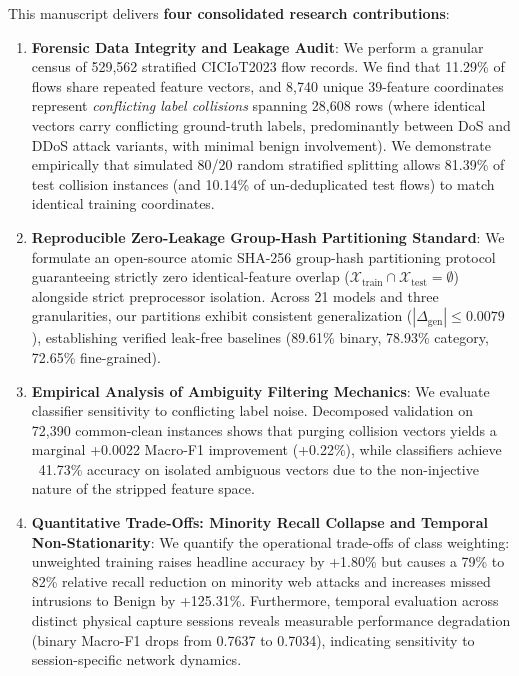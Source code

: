 \documentclass[conference,10pt,twocolumn]{IEEEtran}
\begin{document}
This manuscript delivers \textbf{four consolidated research contributions}:
\begin{enumerate}
    \item \textbf{Forensic Data Integrity and Leakage Audit}: We perform a granular census of 529,562 stratified CICIoT2023 flow records. We find that 11.29\% of flows share repeated feature vectors, and 8,740 unique 39-feature coordinates represent \textit{conflicting label collisions} spanning 28,608 rows (where identical vectors carry conflicting ground-truth labels, predominantly between DoS and DDoS attack variants, with minimal benign involvement). We demonstrate empirically that simulated 80/20 random stratified splitting allows 81.39\% of test collision instances (and 10.14\% of un-deduplicated test flows) to match identical training coordinates.
    \item \textbf{Reproducible Zero-Leakage Group-Hash Partitioning Standard}: We formulate an open-source atomic SHA-256 group-hash partitioning protocol guaranteeing strictly zero identical-feature overlap ($\mathcal{X}_{\text{train}} \cap \mathcal{X}_{\text{test}} = \emptyset$) alongside strict preprocessor isolation. Across 21 models and three granularities, our partitions exhibit consistent generalization ($|\Delta_{\text{gen}}| \le 0.0079$), establishing verified leak-free baselines (89.61\% binary, 78.93\% category, 72.65\% fine-grained).
    \item \textbf{Empirical Analysis of Ambiguity Filtering Mechanics}: We evaluate classifier sensitivity to conflicting label noise. Decomposed validation on 72,390 common-clean instances shows that purging collision vectors yields a marginal +0.0022 Macro-F1 improvement (+0.22\%), while classifiers achieve ~41.73\% accuracy on isolated ambiguous vectors due to the non-injective nature of the stripped feature space.
    \item \textbf{Quantitative Trade-Offs: Minority Recall Collapse and Temporal Non-Stationarity}: We quantify the operational trade-offs of class weighting: unweighted training raises headline accuracy by +1.80\% but causes a 79\% to 82\% relative recall reduction on minority web attacks and increases missed intrusions to Benign by +125.31\%. Furthermore, temporal evaluation across distinct physical capture sessions reveals measurable performance degradation (binary Macro-F1 drops from 0.7637 to 0.7034), indicating sensitivity to session-specific network dynamics.
\end{enumerate}
\end{document}
